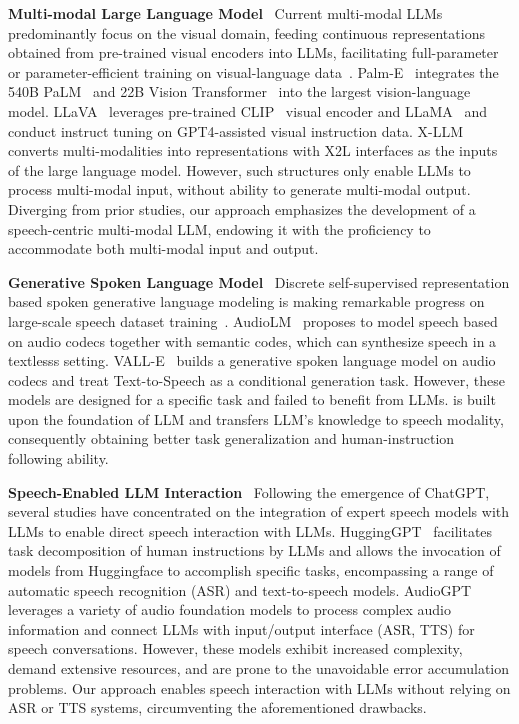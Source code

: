 \noindent\textbf{Multi-modal Large Language Model}~
 Current multi-modal LLMs predominantly focus on the visual domain, feeding continuous representations obtained from pre-trained visual encoders into LLMs, facilitating full-parameter or parameter-efficient training on visual-language data~\citep{openai2023gpt4, huang2023language, zhang2023llamaadapter}.
Palm-E~\citep{driess2023palm} integrates the 540B PaLM~\citep{chowdhery2022palm} and 22B Vision Transformer~\citep{dosovitskiy2021image} into the largest vision-language model.
LLaVA~\citep{liu2023visual} leverages pre-trained CLIP~\citep{radford2021learning} visual encoder and LLaMA~\citep{touvron2023llama} and conduct instruct tuning on GPT4-assisted visual instruction data.
X-LLM~\citep{chen2023xllm} converts multi-modalities into representations with X2L interfaces as the inputs of the large language model.
However, such structures only enable LLMs to process multi-modal input, without ability to generate multi-modal output. Diverging from prior studies, our approach emphasizes the development of a speech-centric multi-modal LLM, endowing it with the proficiency to accommodate both multi-modal input and output.

\noindent\textbf{Generative Spoken  Language Model}~
Discrete self-supervised representation based spoken generative language modeling is making remarkable progress on large-scale speech dataset training~\citep{nguyen2022generative}.
AudioLM~\citep{borsos2022audiolm} proposes to model speech based on audio codecs together with semantic codes, which can synthesize speech in a textlesss setting. VALL-E~\citep{wang2023neural} builds a generative spoken language model on audio codecs and treat Text-to-Speech as a conditional generation task. However, these models are designed for a specific task and failed to benefit from LLMs. \method is built upon the foundation of LLM and transfers LLM’s knowledge to speech modality, consequently obtaining better task generalization and human-instruction following ability.

\noindent\textbf{Speech-Enabled LLM Interaction}~
Following the emergence of ChatGPT, several studies have concentrated on the integration of expert speech models with LLMs to enable direct speech interaction with LLMs. HuggingGPT~\citep{shen2023hugginggpt} facilitates task decomposition of human instructions by LLMs and allows the invocation of models from Huggingface to accomplish specific tasks, encompassing a range of automatic speech recognition (ASR) and text-to-speech models. AudioGPT~\citep{huang2023audiogpt} leverages a variety of audio foundation models to process complex audio information and connect LLMs with input/output interface
(ASR, TTS) for speech conversations. However, these models exhibit increased complexity, demand extensive resources, and are prone to the unavoidable error accumulation problems. Our approach enables speech interaction with LLMs without relying on ASR or TTS systems, circumventing the aforementioned drawbacks.

